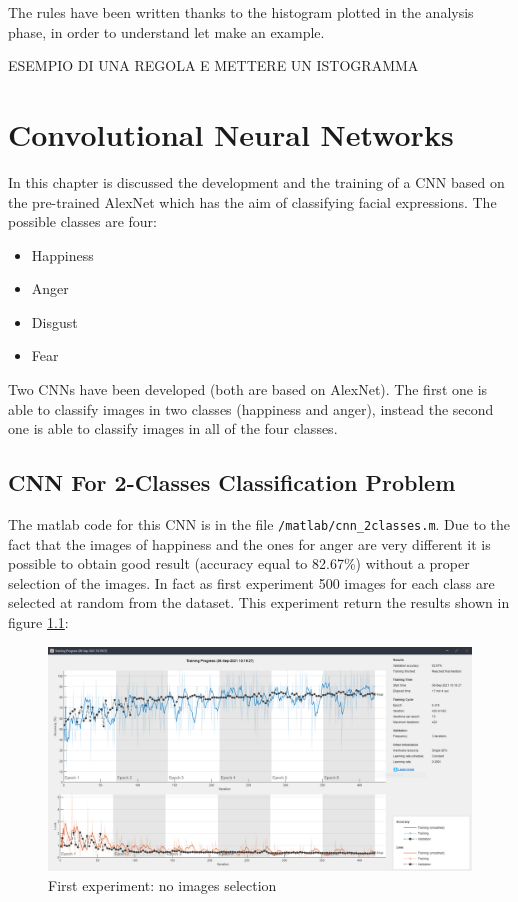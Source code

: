 \documentclass[a4paper]{report}
\begin{document}
	
	\noindent The rules have been written thanks to the histogram plotted in the analysis phase, in order to understand let make an example.
	
	\noindent ESEMPIO DI UNA REGOLA E METTERE UN ISTOGRAMMA
	
	
	
\chapter{Convolutional Neural Networks}
\label{chap: CNN}
	\noindent In this chapter is discussed the development and the training of a CNN based on the pre-trained AlexNet which has the aim of classifying facial expressions. The possible classes are four:
	\begin{itemize}
		\item Happiness
		\item Anger
		\item Disgust
		\item Fear
	\end{itemize} 
	\noindent Two CNNs have been developed (both are based on AlexNet). The first one is able to classify images in two classes (happiness and anger), instead the second one is able to classify images in all of the four classes.
	
	\section{CNN For 2-Classes Classification Problem}
	\noindent The matlab code for this CNN is in the file \texttt{/matlab/cnn\_2classes.m}. Due to the fact that the images of happiness and the ones for anger are very different it is possible to obtain good result (accuracy equal to 82.67\%) without a proper selection of the images.
	\noindent In fact as first experiment 500 images for each class are selected at random from the dataset. This experiment return the results shown in figure \ref{img: trainingCnnTwoClasses}:
	
	\begin{figure}[htbp]
		\centering
		\includegraphics[scale=0.31]{img/trainingCnnTwoClasses.png}
		\caption{First experiment: no images selection}
		\label{img: trainingCnnTwoClasses}
	\end{figure}
\end{document}

